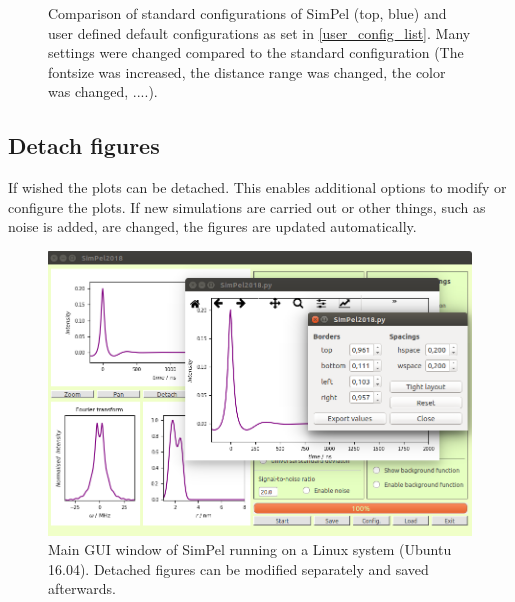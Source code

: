 \documentclass[pdftex,bezier,german,a4,twoside, headexclude,12pt,nochapterprefix, titlepage]{extarticle}
\newcommand{\simpel}{\textsf{SimPel} }
\begin{document}
\begin{figure}[!htb]
    \caption{Comparison of standard configurations of \simpel (top, blue) and user defined default configurations as set in \autoref{user_config_list}. Many settings were changed compared to the standard configuration (The fontsize was increased, the distance range was changed, the color was changed, ....).}
\label{Different_config_figures}
\end{figure} 



\subsection{Detach figures}
If wished the plots can be detached. This enables additional options to modify or configure the plots. If new simulations are carried out
or other things, such as noise is added, are changed, the figures are updated automatically.
\begin{figure}[h!]
\begin{center}
\includegraphics[scale=0.5]{Detach_figures.png}
\caption{Main GUI window of \simpel running on a Linux system (Ubuntu 16.04). Detached figures can be modified separately and saved afterwards.}
\label{Detach_figure}
\end{center}
\end{figure}
\
\\
\newpage
\end{document}
